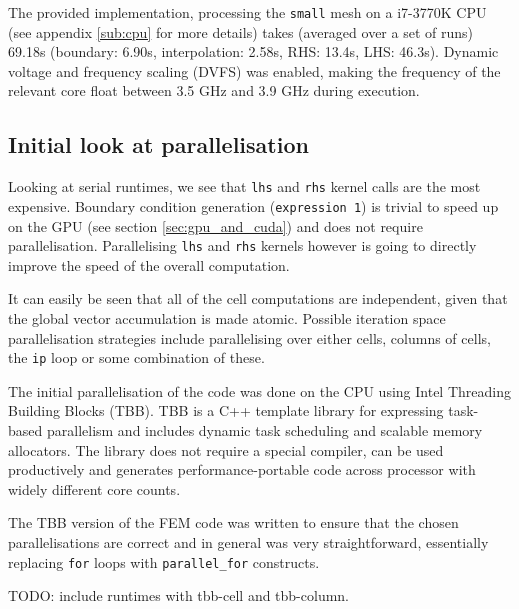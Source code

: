 \documentclass[11pt, oneside, a4paper]{article}
\begin{document}
The provided implementation, processing the \texttt{small} mesh on a i7-3770K CPU (see appendix \ref{sub:cpu} for more details) takes (averaged over a set of runs) 69.18s (boundary: 6.90s, interpolation: 2.58s, RHS: 13.4s, LHS: 46.3s). Dynamic voltage and frequency scaling (DVFS) was enabled, making the frequency of the relevant core float between 3.5 GHz and 3.9 GHz during execution.


\subsection{Initial look at parallelisation} %
\label{sub:initial_look_at_parallelisation}

Looking at serial runtimes, we see that \texttt{lhs} and \texttt{rhs} kernel calls are the most expensive. Boundary condition generation (\texttt{expression 1}) is trivial to speed up on the GPU (see section \ref{sec:gpu_and_cuda}) and does not require parallelisation. Parallelising \texttt{lhs} and \texttt{rhs} kernels however is going to directly improve the speed of the overall computation. 

It can easily be seen that all of the cell computations are independent, given that the global vector accumulation is made atomic. Possible iteration space parallelisation strategies include parallelising over either cells, columns of cells, the \texttt{ip} loop or some combination of these.

The initial parallelisation of the code was done on the CPU using Intel Threading Building Blocks (TBB)\cite{tbbr}. TBB is a C++ template library for expressing task-based parallelism and includes dynamic task scheduling and scalable memory allocators. The library does not require a special compiler, can be used productively and generates performance-portable code across processor with widely different core counts.

The TBB version of the FEM code was written to ensure that the chosen parallelisations are correct and in general was very straightforward, essentially replacing \texttt{for} loops with \texttt{parallel\_for} constructs.

TODO: include runtimes with tbb-cell and tbb-column.

\end{document}
